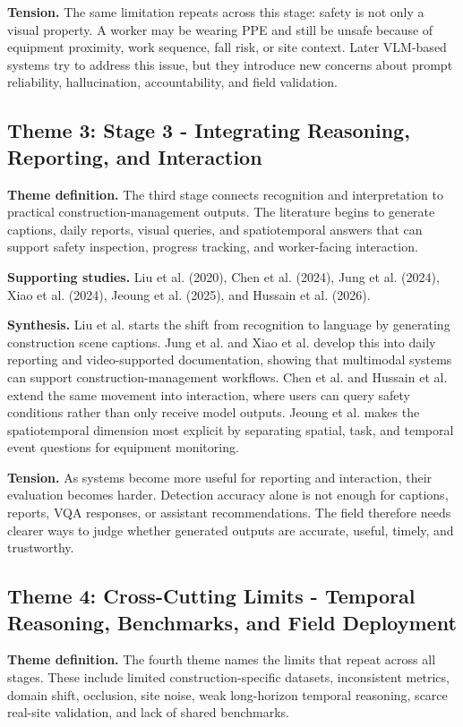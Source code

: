 \documentclass[10pt, letterpaper]{article}
\begin{document}
\textbf{Tension.} The same limitation repeats across this stage: safety is not only a visual property. A worker may be wearing PPE and still be unsafe because of equipment proximity, work sequence, fall risk, or site context. Later VLM-based systems try to address this issue, but they introduce new concerns about prompt reliability, hallucination, accountability, and field validation.

\subsection{Theme 3: Stage 3 - Integrating Reasoning, Reporting, and Interaction}

\textbf{Theme definition.} The third stage connects recognition and interpretation to practical construction-management outputs. The literature begins to generate captions, daily reports, visual queries, and spatiotemporal answers that can support safety inspection, progress tracking, and worker-facing interaction.

\textbf{Supporting studies.} Liu et al. (2020), Chen et al. (2024), Jung et al. (2024), Xiao et al. (2024), Jeoung et al. (2025), and Hussain et al. (2026).

\textbf{Synthesis.} Liu et al. starts the shift from recognition to language by generating construction scene captions. Jung et al. and Xiao et al. develop this into daily reporting and video-supported documentation, showing that multimodal systems can support construction-management workflows. Chen et al. and Hussain et al. extend the same movement into interaction, where users can query safety conditions rather than only receive model outputs. Jeoung et al. makes the spatiotemporal dimension most explicit by separating spatial, task, and temporal event questions for equipment monitoring.

\textbf{Tension.} As systems become more useful for reporting and interaction, their evaluation becomes harder. Detection accuracy alone is not enough for captions, reports, VQA responses, or assistant recommendations. The field therefore needs clearer ways to judge whether generated outputs are accurate, useful, timely, and trustworthy.

\subsection{Theme 4: Cross-Cutting Limits - Temporal Reasoning, Benchmarks, and Field Deployment}

\textbf{Theme definition.} The fourth theme names the limits that repeat across all stages. These include limited construction-specific datasets, inconsistent metrics, domain shift, occlusion, site noise, weak long-horizon temporal reasoning, scarce real-site validation, and lack of shared benchmarks.
\end{document}
